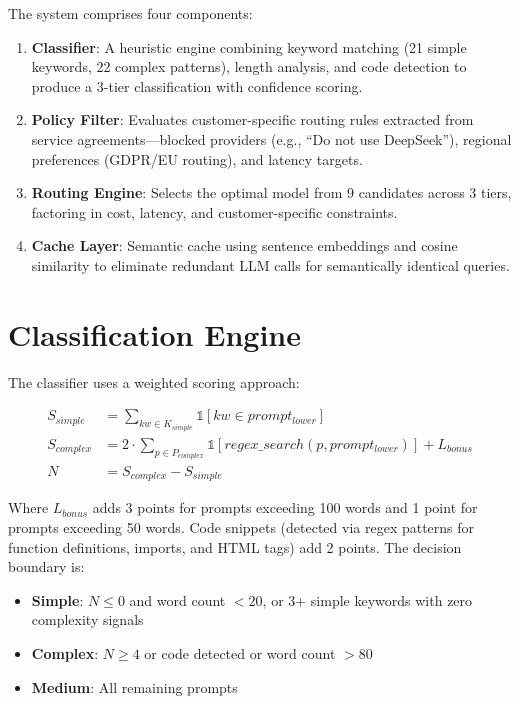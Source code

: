 \documentclass[11pt,a4paper]{article}
\begin{document}
The system comprises four components:

\begin{enumerate}
    \item \textbf{Classifier}: A heuristic engine combining keyword matching (21 simple keywords, 22 complex patterns), length analysis, and code detection to produce a 3-tier classification with confidence scoring.
    \item \textbf{Policy Filter}: Evaluates customer-specific routing rules extracted from service agreements---blocked providers (e.g., ``Do not use DeepSeek''), regional preferences (GDPR/EU routing), and latency targets.
    \item \textbf{Routing Engine}: Selects the optimal model from 9 candidates across 3 tiers, factoring in cost, latency, and customer-specific constraints.
    \item \textbf{Cache Layer}: Semantic cache using sentence embeddings and cosine similarity to eliminate redundant LLM calls for semantically identical queries.
\end{enumerate}

\section{Classification Engine}

The classifier uses a weighted scoring approach:

\begin{align}
S_{simple} &= \sum_{kw \in K_{simple}} \mathbb{1}[kw \in prompt_{lower}] \\
S_{complex} &= 2 \cdot \sum_{p \in P_{complex}} \mathbb{1}[regex\_search(p, prompt_{lower})] + L_{bonus} \\
N &= S_{complex} - S_{simple}
\end{align}

Where $L_{bonus}$ adds 3 points for prompts exceeding 100 words and 1 point for prompts exceeding 50 words. Code snippets (detected via regex patterns for function definitions, imports, and HTML tags) add 2 points. The decision boundary is:

\begin{itemize}
    \item \textbf{Simple}: $N \leq 0$ and word count $< 20$, or 3+ simple keywords with zero complexity signals
    \item \textbf{Complex}: $N \geq 4$ or code detected or word count $> 80$
    \item \textbf{Medium}: All remaining prompts
\end{itemize}
\end{document}
